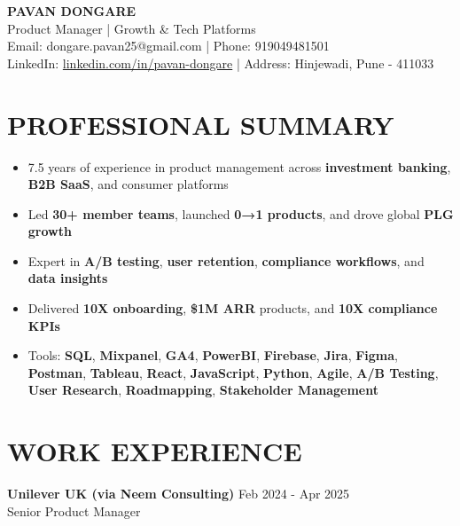 \documentclass[10pt,a4paper]{article}
\newcommand{\experienceitem}[4]{
    \textbf{#1} \hfill #2 \\
    #3 \hfill \textit{#4}
}
\begin{document}
\vspace*{1\baselineskip} %

\begin{center}
    \textbf{\Large PAVAN DONGARE} \\
    Product Manager | Growth \& Tech Platforms \\
    Email: dongare.pavan25@gmail.com | Phone: 919049481501 \\
    LinkedIn: \href{https://linkedin.com/in/pavan-dongare}{linkedin.com/in/pavan-dongare} | Address: Hinjewadi, Pune - 411033
\end{center}

\section{PROFESSIONAL SUMMARY}
\begin{itemize}[leftmargin=*,itemsep=1pt,topsep=1pt]
    \item 7.5 years of experience in product management across \textbf{investment banking}, \textbf{B2B SaaS}, and consumer platforms
    \item Led \textbf{30+ member teams}, launched \textbf{0→1 products}, and drove global \textbf{PLG growth}
    \item Expert in \textbf{A/B testing}, \textbf{user retention}, \textbf{compliance workflows}, and \textbf{data insights}
    \item Delivered \textbf{10X onboarding}, \textbf{\$1M ARR} products, and \textbf{10X compliance KPIs}
    \item Tools: \textbf{SQL}, \textbf{Mixpanel}, \textbf{GA4}, \textbf{PowerBI}, \textbf{Firebase}, \textbf{Jira}, \textbf{Figma}, \textbf{Postman}, \textbf{Tableau}, \textbf{React}, \textbf{JavaScript}, \textbf{Python}, \textbf{Agile}, \textbf{A/B Testing}, \textbf{User Research}, \textbf{Roadmapping}, \textbf{Stakeholder Management}
\end{itemize}

\section{WORK EXPERIENCE}

\experienceitem{\textbf{Unilever UK} (via Neem Consulting)}{Feb 2024 - Apr 2025}{Senior Product Manager}{}
\end{document}
